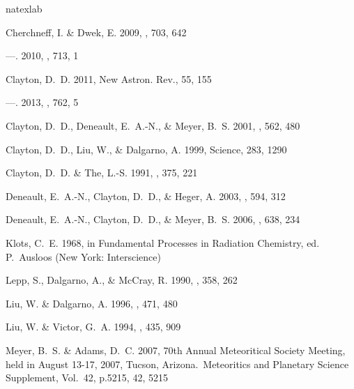 \documentclass[manuscript]{aastex}
\newcommand{\nar}{New Astron. Rev.}
\begin{document}
\begin{thebibliography}{14}
\expandafter\ifx\csname natexlab\endcsname\relax\def\natexlab#1{#1}\fi

{Cherchneff}, I. \& {Dwek}, E. 2009, \apj, 703, 642

---. 2010, \apj, 713, 1

{Clayton}, D.~D. 2011, \nar, 55, 155

---. 2013, \apj, 762, 5

{Clayton}, D.~D., {Deneault}, E.~A.-N., \& {Meyer}, B.~S. 2001, \apj, 562, 480

{Clayton}, D.~D., {Liu}, W., \& {Dalgarno}, A. 1999, Science, 283, 1290

{Clayton}, D.~D. \& {The}, L.-S. 1991, \apj, 375, 221

{Deneault}, E.~A.-N., {Clayton}, D.~D., \& {Heger}, A. 2003, \apj, 594, 312

{Deneault}, E.~A.-N., {Clayton}, D.~D., \& {Meyer}, B.~S. 2006, \apj, 638, 234

{Klots}, C.~E. 1968, in Fundamental Processes in Radiation Chemistry, ed.
  P.~{Ausloos} (New York: Interscience)

{Lepp}, S., {Dalgarno}, A., \& {McCray}, R. 1990, \apj, 358, 262

{Liu}, W. \& {Dalgarno}, A. 1996, \apj, 471, 480

{Liu}, W. \& {Victor}, G.~A. 1994, \apj, 435, 909

{Meyer}, B.~S. \& {Adams}, D.~C. 2007, 70th Annual Meteoritical Society
  Meeting, held in August 13-17, 2007, Tucson, Arizona.~Meteoritics and
  Planetary Science Supplement, Vol.~42, p.5215, 42, 5215

\end{thebibliography}
\end{document}
